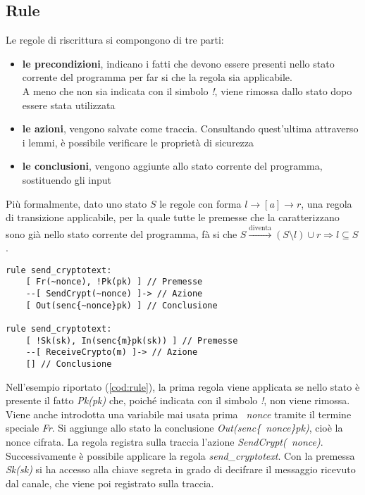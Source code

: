 \subsection{Rule}
Le regole di riscrittura si compongono di tre parti:
\begin{itemize}
    \item \textbf{le precondizioni}, indicano i fatti che devono essere presenti nello stato corrente del programma per far si che la regola sia applicabile. \\
          A meno che non sia indicata con il simbolo \textit{!}, viene rimossa dallo stato dopo essere stata utilizzata
    \item \textbf{le azioni}, vengono salvate come traccia. Consultando quest'ultima attraverso i lemmi, è possibile verificare le proprietà di sicurezza
    \item \textbf{le conclusioni}, vengono aggiunte allo stato corrente del programma, sostituendo gli input
\end{itemize}

Più formalmente, dato uno stato $S$ le regole con forma $l \rightarrow [a] \rightarrow r$, una regola di transizione applicabile, 
per la quale tutte le premesse che la caratterizzano sono già nello stato corrente del programma, 
fà si che $S \xrightarrow{\text{diventa}} (S \setminus l ) \cup r \Rightarrow l \subseteq S$.

\begin{lstlisting}[caption=Regole che modellano l'invio e ricezione di un messaggio cifrato. Si assuma che le premesse \textit{Pk(pk)} e \textit{Sk(sk)} siano già presenti nello stato.,
    label=cod:rule]
rule send_cryptotext:
    [ Fr(~nonce), !Pk(pk) ] // Premesse
    --[ SendCrypt(~nonce) ]-> // Azione
    [ Out(senc{~nonce}pk) ] // Conclusione

rule send_cryptotext:
    [ !Sk(sk), In(senc{m}pk(sk)) ] // Premesse
    --[ ReceiveCrypto(m) ]-> // Azione
    [] // Conclusione
\end{lstlisting}

Nell'esempio riportato (\autoref{cod:rule}), la prima regola viene applicata se nello stato è presente il fatto \textit{Pk(pk)} che,
poiché indicata con il simbolo \textit{!}, non viene rimossa. \\
Viene anche introdotta una variabile mai usata prima \textit{~nonce} tramite il termine speciale \textit{Fr}.
Si aggiunge allo stato la conclusione \textit{Out(senc\{~nonce\}pk)}, cioè la nonce cifrata.
La regola registra sulla traccia l'azione \textit{SendCrypt(~nonce)}. \\
Successivamente è possibile applicare la regola \textit{send\_cryptotext}.
Con la premessa \textit{Sk(sk)} si ha accesso alla chiave segreta in grado di decifrare il messaggio ricevuto dal canale,
che viene poi registrato sulla traccia.

